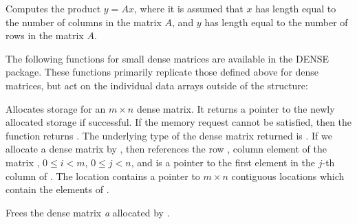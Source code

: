 \documentclass[letterpaper,10pt,english]{sphinxmanual}
\begin{document}

\begin{fulllineitems}
\label{linear_solvers/DLS:c.DenseMatvec}
Computes the product \(y = Ax\), where it is assumed that
\(x\) has length equal to the number of columns in the matrix
\(A\), and \(y\) has length equal to the number of rows in
the matrix \(A\).

\end{fulllineitems}


The following functions for small dense matrices are available in the
DENSE package.  These functions primarily replicate those defined above
for {\hyperref[linear_solvers/DLS:c.DlsMat]{\emph{}}} dense matrices, but act on the individual data
arrays outside of the {\hyperref[linear_solvers/DLS:c.DlsMat]{\emph{}}} structure:

\begin{fulllineitems}
\label{linear_solvers/DLS:c.newDenseMat}
Allocates storage for an \(m \times n\) dense matrix. It
returns a pointer to the newly allocated storage if successful. If
the memory request cannot be satisfied, then the function returns
.  The underlying type of the dense matrix returned is
. If we allocate a dense matrix  by
, then  references the row ,
column  element of the matrix , \(0 \le i < m\),
\(0 \le j < n\), and  is a pointer to the first element
in the \(j\)-th column of . The location  contains
a pointer to \(m \times n\) contiguous locations which contain
the elements of .

\end{fulllineitems}


\begin{fulllineitems}
\label{linear_solvers/DLS:c.destroyMat}
Frees the dense matrix \emph{a} allocated by {\hyperref[linear_solvers/DLS:c.newDenseMat]{\emph{}}}.

\end{fulllineitems}
\end{document}
